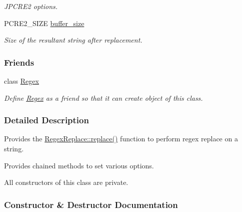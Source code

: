 \begin{DoxyCompactItemize}
\begin{DoxyCompactList}\small\item\em J\+P\+C\+R\+E2 options. \end{DoxyCompactList}\item 
P\+C\+R\+E2\+\_\+\+S\+I\+ZE \hyperlink{classjpcre2_1_1RegexReplace_a44abce541819ceb51e342411b48e95cb}{buffer\+\_\+size}
\begin{DoxyCompactList}\small\item\em Size of the resultant string after replacement. \end{DoxyCompactList}\end{DoxyCompactItemize}
\subsubsection*{Friends}
\begin{DoxyCompactItemize}
\item 
class \hyperlink{classjpcre2_1_1RegexReplace_a1f6f7620b7d2218c6c2a6a47f432ea6a}{Regex}\hypertarget{classjpcre2_1_1RegexReplace_a1f6f7620b7d2218c6c2a6a47f432ea6a}{}\label{classjpcre2_1_1RegexReplace_a1f6f7620b7d2218c6c2a6a47f432ea6a}

\begin{DoxyCompactList}\small\item\em Define \hyperlink{classjpcre2_1_1Regex}{Regex} as a friend so that it can create object of this class. \end{DoxyCompactList}\end{DoxyCompactItemize}


\subsubsection{Detailed Description}
Provides the \hyperlink{classjpcre2_1_1RegexReplace_afd087fa7a9bfedec802d1a3dd7edbdd0}{Regex\+Replace\+::replace()} function to perform regex replace on a string. 

Provides chained methods to set various options.

All constructors of this class are private. 

\subsubsection{Constructor \& Destructor Documentation}

